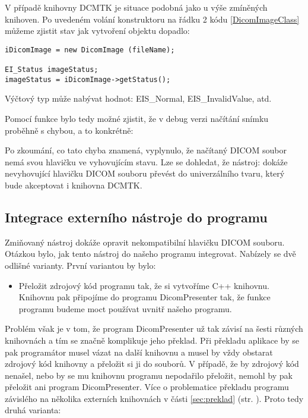 V případě knihovny DCMTK je situace podobná jako u výše zmíněných knihoven. Po uvedeném volání konstruktoru na řádku 2 kódu \ref{DicomImageClass} můžeme zjistit stav jak vytvoření objektu dopadlo:

\begin{lstlisting}[label={xxx}]
iDicomImage = new DicomImage (fileName);

EI_Status imageStatus;
imageStatus = iDicomImage->getStatus();
\end{lstlisting}

Výčtový typ  může nabývat hodnot: EIS\_Normal, EIS\_InvalidValue, atd.

Pomocí funkce  bylo tedy možné zjistit, že v debug verzi načítání snímku proběhně s chybou, a to konkrétně:


Po zkoumání, co tato chyba znamená, vyplynulo, že načítaný DICOM soubor nemá svou hlavičku ve vyhovujícím stavu. Lze se dohledat, že nástroj:  dokáže nevyhovující hlavičku DICOM souboru převést do univerzálního tvaru, který bude akceptovat i knihovna DCMTK.

\subsection{Integrace externího nástroje do programu}
Zmiňovaný nástroj  dokáže opravit nekompatibilní hlavičku DICOM souboru. Otázkou bylo, jak tento nástroj do našeho programu integrovat. Nabízely se dvě odlišné varianty. První variantou by bylo:

\begin{itemize}
\item
Přeložit zdrojový kód programu  tak, že si vytvoříme C++ knihovnu. Knihovnu pak připojíme do programu DicomPresenter tak, že funkce programu  budeme moct používat uvnitř našeho programu.
\end{itemize}

Problém však je v tom, že program DicomPresenter už tak závisí na šesti různých knihovnách a tím se značně komplikuje jeho překlad. Při překladu aplikace by se pak programátor musel vázat na další knihovnu a musel by vždy obstarat zdrojový kód knihovny a přeložit si ji do  souborů. V případě, že by zdrojový kód nenašel, nebo by se mu knihovnu programu  nepodařilo přeložit, nemohl by pak přeložit ani program DicomPresenter. Více o problematice překladu programu závislého na několika externích knihovnách v části \ref{sec:preklad} (str. \pageref{sec:preklad}). Proto tedy druhá varianta:

